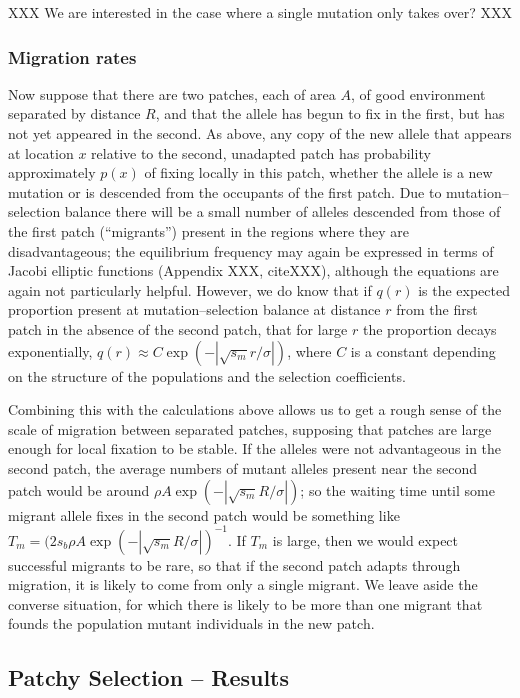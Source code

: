 \documentclass{article}
\begin{document}
{XXX We are interested in the case where a single mutation only takes over? XXX

\subsubsection{Migration rates}
\label{ss:patchymigration}

Now suppose that there are two patches, each of area $A$, of good environment separated by distance $R$,
and that the allele has begun to fix in the first, but has not yet appeared in the second.
As above, any copy of the new allele that appears at location $x$ relative to the second, unadapted patch 
has probability approximately $p(x)$ of fixing locally in this patch,
whether the allele is a new mutation or is descended from the occupants of the first patch.
Due to mutation--selection balance there will be a small number of alleles descended from those of the first patch (``migrants'') 
present in the regions where they are disadvantageous;
the equilibrium frequency may again be expressed in terms of Jacobi elliptic functions (Appendix XXX, citeXXX),
although the equations are again not particularly helpful.
However, we do know that if $q(r)$ is the expected proportion present at mutation--selection balance at distance $r$ from the first patch
in the absence of the second patch, that for large $r$ the proportion decays exponentially, $q(r) \approx C \exp( -|\sqrt{s_m} r / \sigma|)$,
where $C$ is a constant depending on the structure of the populations and the selection coefficients.

Combining this with the calculations above allows us to get a rough sense of the scale of migration between separated patches,
supposing that patches are large enough for local fixation to be stable.
If the alleles were not advantageous in the second patch,
the average numbers of mutant alleles present near the second patch would be around $\rho A \exp( - |\sqrt{s_m} R/\sigma| )$;
so the waiting time until some migrant allele fixes in the second patch would be something like $T_m = ( 2 s_b \rho A \exp( - |\sqrt{s_m} R/\sigma|)^{-1}$.
If $T_m$ is large, then we would expect successful migrants to be rare,
so that if the second patch adapts through migration, it is likely to come from only a single migrant.
We leave aside the converse situation, for which there is likely to be more than one migrant
that founds the population mutant individuals in the new patch.


\subsection{Patchy Selection -- Results} 
\label{ss:discreteresults}

}
\end{document}
